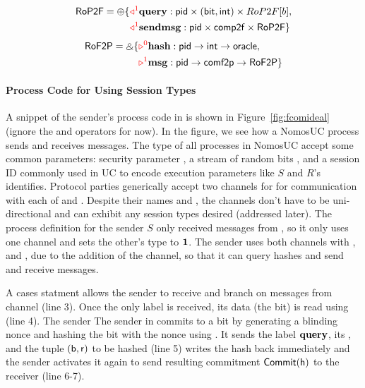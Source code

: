 \begin{align*}
    \mathsf{RoP2F} = \oplus \{ &\textcolor{red}{\triangleleft^1} \mathbf{query}: \mathsf{pid} \times (\mathsf{bit},\mathsf{int}) \times RoP2F[b], \\
    &\textcolor{red}{\triangleleft^{1}} \mathbf{sendmsg}: \mathsf{pid} \times \mathsf{comp2f} \times \mathsf{RoP2F} \}
\end{align*}
\begin{align*}
    \mathsf{RoF2P} = \mathbin{\binampersand} \{ &\textcolor{red}{\triangleright^{0}} \mathbf{hash}: \mathsf{pid} \rightarrow \mathsf{int} \rightarrow \mathsf{oracle}, \\
    &\textcolor{red}{\triangleright^{1}} \mathbf{msg}: \mathsf{pid} \rightarrow \mathsf{comf2p} \rightarrow \mathsf{RoF2P} \}
\end{align*}

\paragraph*{\textbf{Process Code for Using Session Types}}
A snippet of the sender's process code in \protcom is shown in Figure~\ref{fig:fcomideal} (ignore the \ipay and \iget operators for now).
In the figure, we see how a NomosUC process sends and receives messages.
The type of all processes in NomosUC accept some common parameters: security parameter , a stream of random bits , and a session ID  commonly used in UC to encode execution parameters like $S$ and $R$'s identifies.
Protocol parties generically accept two channels for for communication with each of \F and \Z. 
Despite their names  and , the channels don't have to be uni-directional and can exhibit any session types desired (addressed later). %
The process definition for the sender $S$ only received messages from \Z, so it only uses one channel and sets the other's type to $\mathbf{1}$.
The sender uses both channels with \Fro,  and , due to the addition of the channel, so that it can  query hashes and send and receive messages.

A cases statment allows the sender to receive and branch on messages from channel  (line 3).
Once the only label  is received, its data (the bit) is read using \inline{$\nrecv$} (line 4).
The sender 
The sender in \protcom commits to a bit by generating a blinding nonce and hashing the bit with the nonce using \Fro.
It sends the label $\mathbf{query}$, its , and the tuple $\mathsf{(b,r)}$ to be hashed (line 5)
\Fro writes the hash back immediately and the sender activates it again to send resulting commitment $\mathsf{Commit(h)}$ to the receiver (line 6-7).

